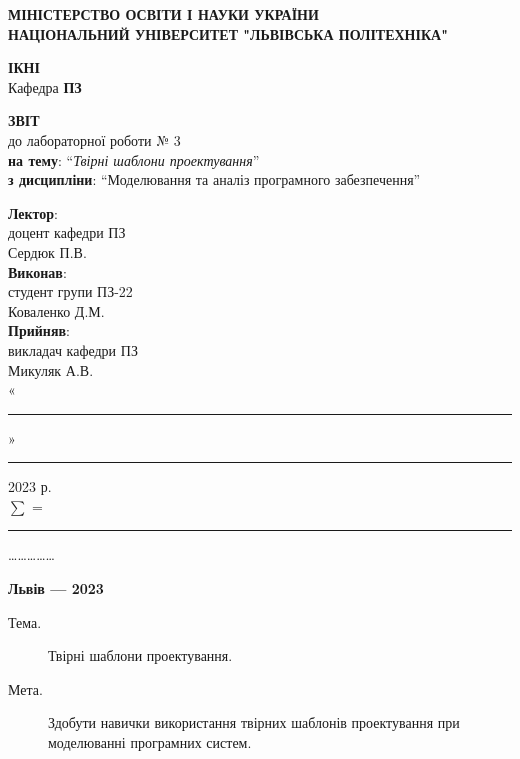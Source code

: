 \documentclass[oneside,14pt]{extarticle}
\newcommand\subject{Моделювання та аналіз програмного забезпечення}
\newcommand\lecturer{доцент кафедри ПЗ \\ Сердюк П.В.}
\newcommand\teacher{викладач кафедри ПЗ \\ Микуляк А.В.}
\newcommand\mygroup{ПЗ-22}
\newcommand\lab{3}
\newcommand\theme{Твірні шаблони проектування}
\newcommand\purpose{Здобути навички використання твірних шаблонів проектування при моделюванні програмних систем}
\begin{document}
\begin{normalsize}
	\begin{titlepage}
		\thispagestyle{empty}
		\begin{center}
			\textbf{МІНІСТЕРСТВО ОСВІТИ І НАУКИ УКРАЇНИ\\
				НАЦІОНАЛЬНИЙ УНІВЕРСИТЕТ "ЛЬВІВСЬКА ПОЛІТЕХНІКА"}
		\end{center}
		\begin{flushright}
			\textbf{ІКНІ}\\
			Кафедра \textbf{ПЗ}
		\end{flushright}
		\vspace{70pt}
		\begin{center}
			\textbf{ЗВІТ}\\
			\vspace{10pt}
			до лабораторної роботи № \lab\\
			\textbf{на тему}: “\textit{\theme}”\\
			\textbf{з дисципліни}: “\subject”
		\end{center}
		\vspace{50pt}
		\begin{flushright}
			
			\textbf{Лектор}:\\
			\lecturer\\
			\vspace{10pt}
			\textbf{Виконав}:\\
			
			студент групи \mygroup\\
			Коваленко Д.М.\\
			\vspace{10pt}
			\textbf{Прийняв}:\\
			
			\teacher\\
			
			\vspace{28pt}
			«\rule{1cm}{0.15mm}» \rule{1.5cm}{0.15mm} 2023 р.\\
			$\sum$ = \rule{1cm}{0.15mm}……………\\
			
		\end{flushright}
		\vspace{\fill}
		\begin{center}
			\textbf{Львів — 2023}
		\end{center}
	\end{titlepage}
		
	\begin{description}
		\item[Тема.] \theme.
		\item[Мета.] \purpose.
	\end{description}


\end{normalsize}
\end{document}
